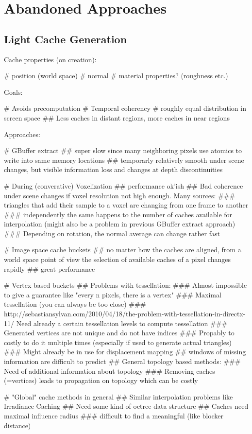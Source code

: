 \documentclass[thesis.tex]{subfiles}
\begin{document}
\appendix


\chapter{Abandoned Approaches} \label{chap:abandoned}

\section{Light Cache Generation}

Cache properties (on creation):
\begin{easylist}[itemize]
# position (world space)
# normal
# material properties? (roughness etc.)
\end{easylist}

Goals:
\begin{easylist}[itemize]
# Avoids precomputation
# Temporal coherency
# roughly equal distribution in screen space
## Less caches in distant regions, more caches in near regions
\end{easylist}
Approaches:
\begin{easylist}[itemize]
# GBuffer extract
## super slow since many neighboring pixels use atomics to write into same memory locations
## temporarly relatively smooth under scene changes, but visible information loss and changes at depth discontinuities

# During (converative) Voxelization
## performance ok'ish
## Bad coherence under scene changes if voxel resolution not high enough. Many sources:
### triangles that add their sample to a voxel are changing from one frame to another
### independently the same happens to the number of caches available for interpolation (might also be a problem in previous GBuffer extract approach)
### Depending on rotation, the normal average can change rather fast

# Image space cache buckets
## no matter how the caches are aligned, from a world space point of view the selection of available caches of a pixel changes rapidly
## great performance

# Vertex based buckets
## Problems with tessellation:
### Almost impossible to give a guarantee like "every n pixels, there is a vertex"
### Maximal tessellation (you can always be too close)
### http://sebastiansylvan.com/2010/04/18/the-problem-with-tessellation-in-directx-11/
Need already a certain tessellation levels to compute tessellation
### Generated vertices are not unique and do not have indices
### Propably to costly to do it multiple times (especially if used to generate actual triangles)
### Might already be in use for displacement mapping
## windows of missing information are difficult to predict
## General topology based methods:
### Need of additional information about topology
### Removing caches (=vertices) leads to propagation on topology which can be costly

# "Global" cache methods in general
## Similar interpolation problems like Irradiance Caching
## Need some kind of octree data structure
## Caches need maximal influence radius
### difficult to find a meaningful (like blocker distance)
\end{easylist}
\end{document}
